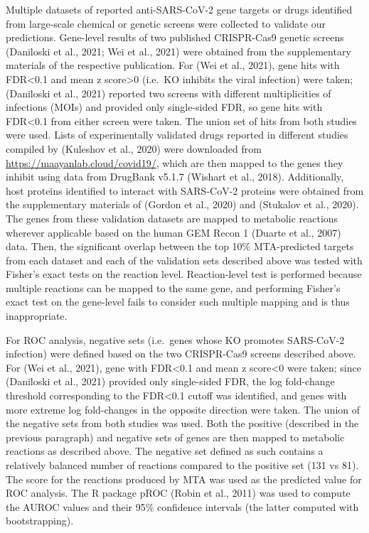 \documentclass[12pt,twoside,openany,\mydriver]{thesis}  %
\begin{document}
Multiple datasets of reported anti-SARS-CoV-2 gene targets or drugs identified from large-scale chemical or genetic screens were collected to validate our predictions. Gene-level results of two published CRISPR-Cas9 genetic screens (Daniloski et al., 2021; Wei et al., 2021) were obtained from the supplementary materials of the respective publication. For (Wei et al., 2021), gene hits with FDR\textless{}0.1 and mean z score\textgreater{}0 (i.e.~KO inhibits the viral infection) were taken; (Daniloski et al., 2021) reported two screens with different multiplicities of infections (MOIs) and provided only single-sided FDR, so gene hits with FDR\textless{}0.1 from either screen were taken. The union set of hits from both studies were used. Lists of experimentally validated drugs reported in different studies compiled by (Kuleshov et al., 2020) were downloaded from \url{https://maayanlab.cloud/covid19/}, which are then mapped to the genes they inhibit using data from DrugBank v5.1.7 (Wishart et al., 2018). Additionally, host proteins identified to interact with SARS-CoV-2 proteins were obtained from the supplementary materials of (Gordon et al., 2020) and (Stukalov et al., 2020). The genes from these validation datasets are mapped to metabolic reactions wherever applicable based on the human GEM Recon 1 (Duarte et al., 2007) data. Then, the significant overlap between the top 10\% MTA-predicted targets from each dataset and each of the validation sets described above was tested with Fisher's exact tests on the reaction level. Reaction-level test is performed because multiple reactions can be mapped to the same gene, and performing Fisher's exact test on the gene-level fails to consider such multiple mapping and is thus inappropriate.

For ROC analysis, negative sets (i.e.~genes whose KO promotes SARS-CoV-2 infection) were defined based on the two CRISPR-Cas9 screens described above. For (Wei et al., 2021), gene with FDR\textless{}0.1 and mean z score\textless{}0 were taken; since (Daniloski et al., 2021) provided only single-sided FDR, the log fold-change threshold corresponding to the FDR\textless{}0.1 cutoff was identified, and genes with more extreme log fold-changes in the opposite direction were taken. The union of the negative sets from both studies was used. Both the positive (described in the previous paragraph) and negative sets of genes are then mapped to metabolic reactions as described above. The negative set defined as such contains a relatively balanced number of reactions compared to the positive set (131 vs 81). The score for the reactions produced by MTA was used as the predicted value for ROC analysis. The R package pROC (Robin et al., 2011) was used to compute the AUROC values and their 95\% confidence intervals (the latter computed with bootstrapping).
\end{document}
